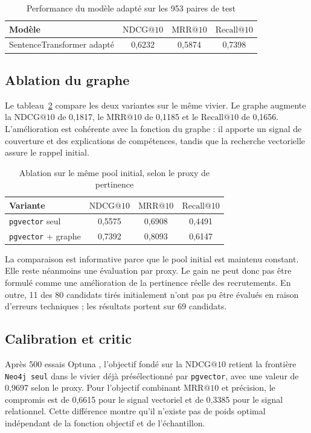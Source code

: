\documentclass[10pt]{article}
\makeatletter
\newcommand{\pgvector}{\texttt{pgvector}}
\newcommand{\ndcg}{\ensuremath{\mathrm{NDCG@10}}}
\newcommand{\mrr}{\ensuremath{\mathrm{MRR@10}}}
\newcommand{\recall}{\ensuremath{\mathrm{Recall@10}}}
\makeatother
\begin{document}
\begin{table}[ht]
\centering
\caption{Performance du modèle adapté sur les 953 paires de test}
\label{tab:embedding}
\small
\begin{tabularx}{\linewidth}{>{\raggedright\arraybackslash}X c c c}
\toprule
Modèle & \ndcg{} & \mrr{} & \recall{} \\
\midrule
SentenceTransformer adapté & 0,6232 & 0,5874 & 0,7398 \\
\bottomrule
\end{tabularx}
\end{table}

\subsection{Ablation du graphe}
Le tableau~\ref{tab:ablation} compare les deux variantes sur le même vivier. Le graphe augmente la \ndcg{} de 0,1817, le \mrr{} de 0,1185 et le \recall{} de 0,1656. L'amélioration est cohérente avec la fonction du graphe : il apporte un signal de couverture et des explications de compétences, tandis que la recherche vectorielle assure le rappel initial.

\begin{table}[ht]
\centering
\caption{Ablation sur le même pool initial, selon le proxy de pertinence}
\label{tab:ablation}
\small
\begin{tabularx}{\linewidth}{>{\raggedright\arraybackslash}X c c c}
\toprule
Variante & \ndcg{} & \mrr{} & \recall{} \\
\midrule
\pgvector{} seul & 0,5575 & 0,6908 & 0,4491 \\
\pgvector{} + graphe & 0,7392 & 0,8093 & 0,6147 \\
\bottomrule
\end{tabularx}
\end{table}

La comparaison est informative parce que le pool initial est maintenu constant. Elle reste néanmoins une évaluation par proxy. Le gain ne peut donc pas être formulé comme une amélioration de la pertinence réelle des recrutements. En outre, 11 des 80 candidats tirés initialement n'ont pas pu être évalués en raison d'erreurs techniques ; les résultats portent sur 69 candidats.

\subsection{Calibration et critic}
Après 500 essais Optuna \citep{akiba2019optuna}, l'objectif fondé sur la \ndcg{} retient la frontière \texttt{Neo4j seul} dans le vivier déjà présélectionné par \pgvector{}, avec une valeur de 0,9697 selon le proxy. Pour l'objectif combinant \mrr{} et précision, le compromis est de 0,6615 pour le signal vectoriel et de 0,3385 pour le signal relationnel. Cette différence montre qu'il n'existe pas de poids optimal indépendant de la fonction objectif et de l'échantillon.
\end{document}
